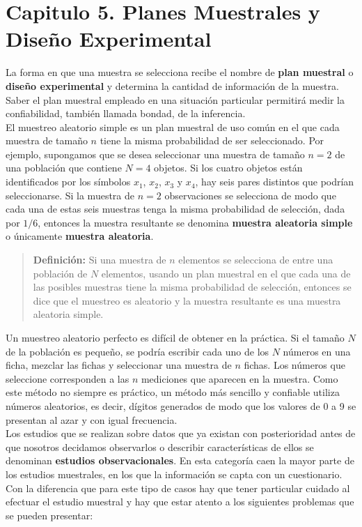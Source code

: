 \documentclass[]{article}
\begin{document}
\section{Capitulo 5. Planes Muestrales y Diseño Experimental}
La forma en que una muestra se selecciona recibe el nombre de \textbf{plan muestral} o \textbf{diseño experimental} y determina la cantidad de información de la muestra. Saber el plan muestral empleado en una situación particular permitirá medir la confiabilidad, también llamada bondad, de la inferencia.
\\ El muestreo aleatorio simple es un plan muestral de uso común en el que cada muestra de tamaño $n$ tiene la misma probabilidad de ser seleccionado. Por ejemplo, supongamos que se desea seleccionar una muestra de tamaño $n = 2$ de una población que contiene $N = 4$ objetos. Si los cuatro objetos están identificados por los símbolos $x_1$, $x_2$, $x_3$ y $x_4$, hay seis pares distintos que podrían seleccionarse. Si la muestra de $n = 2$ observaciones se selecciona de modo que cada una de estas seis muestras tenga la misma probabilidad de selección, dada por $1/6$, entonces la muestra resultante se denomina \textbf{muestra aleatoria simple} o únicamente \textbf{muestra aleatoria}.
\begin{quote}
	\textbf{Definición:} Si una muestra de $n$ elementos se selecciona de entre una población de $N$ elementos, usando un plan muestral en el que cada una de las posibles muestras tiene la misma probabilidad de selección, entonces se dice que el muestreo es aleatorio y la muestra resultante es una muestra aleatoria simple.
\end{quote}
Un muestreo aleatorio perfecto es difícil de obtener en la práctica. Si el tamaño $N$ de la población es pequeño, se podría escribir cada uno de los $N$ números en una ficha, mezclar las fichas y seleccionar una muestra de $n$ fichas. Los números que seleccione corresponden a las $n$ mediciones que aparecen en la muestra. Como este método no siempre es práctico, un método más sencillo y confiable utiliza números aleatorios, es decir, dígitos generados de modo que los valores de 0 a 9 se presentan al azar y con igual frecuencia.
\\ Los estudios que se realizan sobre datos que ya existan con posterioridad antes de que nosotros decidamos observarlos o describir características de ellos se denominan \textbf{estudios observacionales}. En esta categoría caen la  mayor parte de los estudios muestrales, en los que la información se capta con un cuestionario. Con la diferencia que para este tipo de casos hay que tener particular cuidado al efectuar el estudio muestral y hay que estar atento a los siguientes problemas que se pueden presentar:
\end{document}
